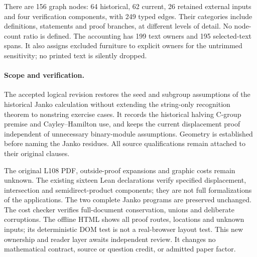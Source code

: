 \documentclass[a4paper,11pt]{article}
\begin{document}
There are 156 graph nodes: 64 historical, 62 current, 26 retained external
inputs and four verification components, with 249 typed edges. Their categories
include definitions, statements and proof branches, at different levels of
detail. No node-count ratio is defined. The accounting has 199 text owners
and 195 selected-text spans. It also assigns excluded furniture to explicit
owners for the untrimmed sensitivity; no printed text is silently dropped.

\paragraph{Scope and verification.}
The accepted logical revision restores the seed and subgroup assumptions of
the historical Janko calculation without extending the string-only recognition
theorem to nonstring exercise cases. It records the historical halving C-group
premise and Cayley--Hamilton use, and keeps the current displacement proof
independent of unnecessary binary-module assumptions. Geometry is established
before naming the Janko residues. All source qualifications remain attached
to their original clauses.

The original L108 PDF, outside-proof expansions and graphic costs remain
unknown. The existing sixteen Lean declarations verify specified displacement,
intersection and semidirect-product components; they are not full formalizations
of the applications. The two complete Janko programs are preserved unchanged.
The cost checker verifies full-document conservation, unions and deliberate
corruptions. The offline HTML shows all proof routes, locations and unknown
inputs; its deterministic DOM test is not a real-browser layout test.
This new ownership and reader layer awaits independent review. It changes
no mathematical contract, source or question credit, or admitted paper factor.
\end{document}
